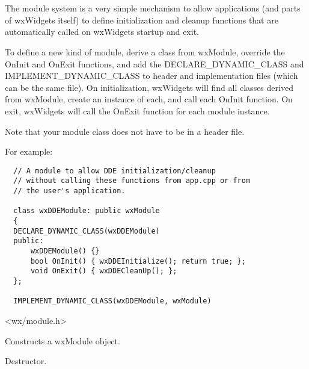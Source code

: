 \section{}\label{wxmodule}

The module system is a very simple mechanism to allow applications (and parts of wxWidgets itself) to
define initialization and cleanup functions that are automatically called on wxWidgets
startup and exit.

To define a new kind of module, derive a class from wxModule, override the OnInit and OnExit functions,
and add the DECLARE\_DYNAMIC\_CLASS and IMPLEMENT\_DYNAMIC\_CLASS to header and implementation files
(which can be the same file). On initialization, wxWidgets will find all classes derived from wxModule,
create an instance of each, and call each OnInit function. On exit, wxWidgets will call the OnExit
function for each module instance.

Note that your module class does not have to be in a header file.

For example:

\begin{verbatim}
  // A module to allow DDE initialization/cleanup
  // without calling these functions from app.cpp or from
  // the user's application.

  class wxDDEModule: public wxModule
  {
  DECLARE_DYNAMIC_CLASS(wxDDEModule)
  public:
      wxDDEModule() {}
      bool OnInit() { wxDDEInitialize(); return true; };
      void OnExit() { wxDDECleanUp(); };
  };

  IMPLEMENT_DYNAMIC_CLASS(wxDDEModule, wxModule)
\end{verbatim}




<wx/module.h>


\label{wxmoduleconstr}


Constructs a wxModule object.



Destructor.

\label{wxmodulecleanupmodules}

